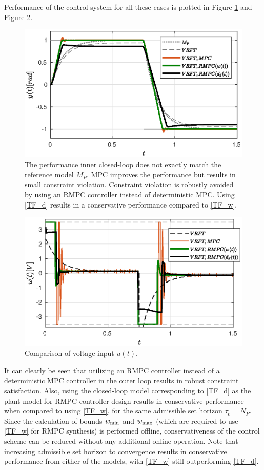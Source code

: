 \documentclass[letterpaper, 10 pt, conference]{ieeeconf}  %
\begin{document}
	Performance of the control system for all these cases is plotted in Figure \ref{VRFT_y} and Figure \ref{VRFT_u}.
	\begin{figure}[t]
		\hspace{20pt}
		\includegraphics[scale = 0.50]{VRFT_vs_MPC.eps}
		\caption{The performance inner closed-loop does not exactly match the reference model $M_P$. MPC improves the performance but results in small constraint violation. Constraint violation is robustly avoided by using an RMPC controller instead of deterministic MPC. Using \eqref{TF_d} results in a conservative performance compared to \eqref{TF_w}.  }
		\label{VRFT_y}
	\end{figure} 
	\begin{figure}[t]
		\hspace{20pt}
		\includegraphics[scale = 0.50]{VRFT_vs_MPC_u.eps}
		\caption{Comparison of voltage input $u(t)$.}
		\label{VRFT_u}
	\end{figure} 
	It can clearly be seen that utilizing an RMPC controller instead of a deterministic MPC controller in the outer loop results in robust constraint satisfaction. Also, using the closed-loop model corresponding to \eqref{TF_d} as the plant model for RMPC controller design results in conservative performance when compared to using \eqref{TF_w}, for the same admissible set horizon $\tau_c = N_P$. Since the calculation of bounds $w_{\rm min}$ and $w_{\rm max}$ (which are required to use \eqref{TF_w} for RMPC synthesis) is performed offline, conservativeness of the control scheme can be reduced without any additional online operation. Note that increasing admissible set horizon to convergence results in conservative performance from either of the models, with \eqref{TF_w} still outperforming \eqref{TF_d}. 
	
\end{document}
